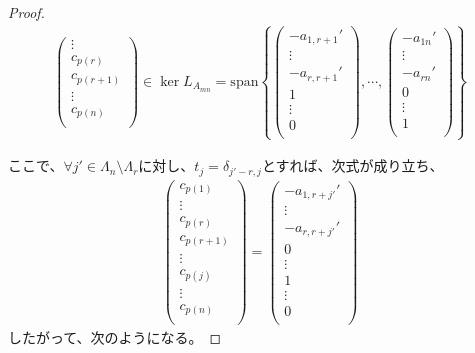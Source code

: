 \documentclass[dvipdfmx]{jsarticle}
\begin{document}
\begin{proof}
\begin{align*}
\begin{pmatrix}
 \vdots \\
c_{p(r)} \\
c_{p(r + 1)} \\
 \vdots \\
c_{p(n)} \\
\end{pmatrix} \in \ker L_{A_{mn}} = {\mathrm{span} }\left\{ \begin{pmatrix}
 - a_{1,r + 1}' \\
 \vdots \\
 - a_{r,r + 1}' \\
1 \\
 \vdots \\
0 \\
\end{pmatrix},\cdots,\begin{pmatrix}
 - a_{1n}' \\
 \vdots \\
 - a_{rn}' \\
0 \\
 \vdots \\
1 \\
\end{pmatrix} \right\}
\end{align*}\par
ここで、$\forall j' \in \varLambda_{n} \setminus \varLambda_{r}$に対し、$t_{j} = \delta_{j' - r,j}$とすれば、次式が成り立ち、
\begin{align*}
\begin{pmatrix}
c_{p(1)} \\
 \vdots \\
c_{p(r)} \\
c_{p(r + 1)} \\
 \vdots \\
c_{p(j)} \\
 \vdots \\
c_{p(n)} \\
\end{pmatrix} = \begin{pmatrix}
 - a_{1,r + j'}' \\
 \vdots \\
 - a_{r,r + j'}' \\
0 \\
 \vdots \\
1 \\
 \vdots \\
0 \\
\end{pmatrix}
\end{align*}
したがって、次のようになる。

\end{proof}
\end{document}
